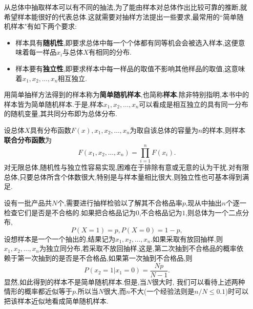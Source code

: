 从总体中抽取样本可以有不同的抽法,为了能由样本对总体作出比较可靠的推断,就希望样本能很好的代表总体.这就需要对抽样方法提出一些要求,最常用的``简单随机样本"有如下两个要求:
\begin{itemize}
\item 样本具有\textbf{随机性},即要求总体中每一个个体都有同等机会会被选入样本,这便意味着每一样品$x_i$与总体$X$有相同的分布.
\item 样本要有\textbf{独立性},即要求样本中每一样品的取值不影响其他样品的取值,这意味着$x_1,x_2,\dotsc,x_n$相互独立.
\end{itemize}

用简单抽样方法得到的样本称为\textbf{简单随机样本},也简称\textbf{样本}.除非特别指明,本书中的样本皆为简单随机样本.于是,样本$x_1,x_2,\dotsc,x_n$可以看成是相互独立的具有同一分布的随机变量,其共同分布即为总体分布.

设总体$X$具有分布函数$F(x),x_1,x_2,\dotsc,x_n$为取自该总体的容量为$n$的样本,则样本\textbf{联合分布函数}为
\[F(x_1,x_2,\dotsc,x_n)=\prod_{i=1}^nF(x_i).\]
对无限总体,随机性与独立性容易实现,困难在于排除有意或无意的认为干扰.对有限总体,只要总体所含个体数很大,特别是与样本量相比很大,则独立性也可基本得到满足.
\begin{example}
设有一批产品共$N$个,需要进行抽样检验以了解其不合格品率$p$,现从中抽出$n$个逐一检查它们是否是不合格的.如果把合格品记为$0$,不合格品记为$1$,则总体为一个二点分布,
\[P(X=1)=p,P(X=0)=1-p,\]
设想样本是一个一个抽出的,结果记为$x_1,x_2,\dotsc,x_n$.如果采取有放回抽样,则$x_1,x_2,\dotsc,x_n$为独立同分布,若采取不放回抽样,这是,第二次抽到不合格品的概率依赖于第一次抽到的是否是不合格品,如果第一次抽到不合格品,则
\[P(x_2=1|x_1=0)=\frac{Np}{N-1}.\]
显然,如此得到的样本不是简单随机样本.但是,当$N$很大时, 我们可以看待上述两种情形的概率都近似等于$p$.所以当$N$很大,而$n$不大(一个经验法则是$n/N\leq0.1$)时可以把该样本近似地看成简单随机样本.
\end{example}

